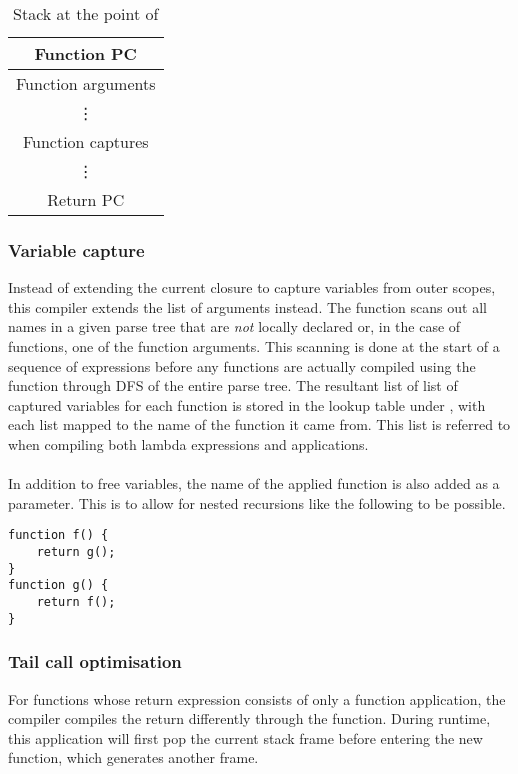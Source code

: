 \begin{table}[!h]
\begin{center}
\begin{tabular}{ |c| } 
 \hline
 Function PC \\
 \hline
 Function arguments \\
 \vdots \\
 \hline
 Function captures \\
 \vdots \\
 \hline
 Return PC \\
 \hline
\end{tabular}
\caption*{Stack at the point of }
\end{center}
\end{table}
\newpage
\subsubsection{Variable capture}
Instead of extending the current closure to capture variables from outer scopes, this compiler extends the list of arguments instead. The function  scans out all names in a given parse tree that are \textit{not} locally declared or, in the case of functions, one of the function arguments. This scanning is done at the start of a sequence of expressions before any functions are actually compiled using the  function through DFS of the entire parse tree. The resultant list of list of captured variables for each function is stored in the lookup table under , with each list mapped to the name of the function it came from. This list is referred to when compiling both lambda expressions and applications.\\\\
In addition to free variables, the name of the applied function is also added as a parameter. This is to allow for nested recursions like the following to be possible. 
\begin{center}
\begin{verbatim}
function f() {
    return g();
}
function g() {
    return f();
}
\end{verbatim}
\end{center}

\subsubsection{Tail call optimisation}
For functions whose return expression consists of only a function application, the compiler compiles the return differently through the  function. During runtime, this application will first pop the current stack frame before entering the new function, which generates another frame. 

